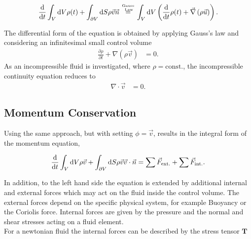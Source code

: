 \begin{align}
    \frac{\mathop{}\!\mathrm{d}}{\mathop{}\!\mathrm{d} t} \int_V \mathop{}\!\mathrm{d} V \rho(t) + \int_{\partial V}\mathop{}\!\mathrm{d} S \rho \vec{v}\vec{n}
     \stackrel{\text{Gauss} \atop \text{ Law}}{=}
    \int_V \mathop{}\!\mathrm{d} V \left( \frac{\mathop{}\!\mathrm{d}}{\mathop{}\!\mathrm{d} t} \rho(t) + \vec{\nabla}\left(\rho \vec{u}\right)\right).
\end{align}

The differential form of the equation is obtained by applying Gauss's law and considering an infinitesimal small control volume
\begin{align}
     \frac{\partial \rho}{\partial t}  + \nabla \left(\rho \vec{v}\right) &= 0.
\end{align}
As an incompressible fluid is investigated, where $\rho = \text{const.}$, the incompressible continuity equation reduces to
\begin{align}
     \nabla \cdot \vec{v} &= 0.
\end{align}

\subsection{Momentum Conservation}

Using the same approach, but with setting $\phi = \vec{v}$, results in the integral form of the momentum equation,

\begin{align}
    \label{theorie:intimpulse}
    \frac{\mathop{}\!\mathrm{d}}{\mathop{}\!\mathrm{d} t} \int_V \mathop{}\!\mathrm{d} V \rho \vec{v} + \int_{\partial V} \mathop{}\!\mathrm{d} S \rho\vec{v}\vec{v}\cdot \vec{n}  =  \sum \vec{F}_{\text{ext.}} + \sum \vec{F}_{\text{int.}}.
\end{align}

In addition, to the left hand side the equation is extended by additional internal and external forces which may act on the fluid inside the control volume.
The external forces depend on the specific physical system, for example Buoyancy or the Coriolis force. Internal forces
are given by the pressure and the normal and shear stresses acting on a fluid element.\\
For a newtonian fluid the internal forces can be described by the stress tensor $\bm{T}$

